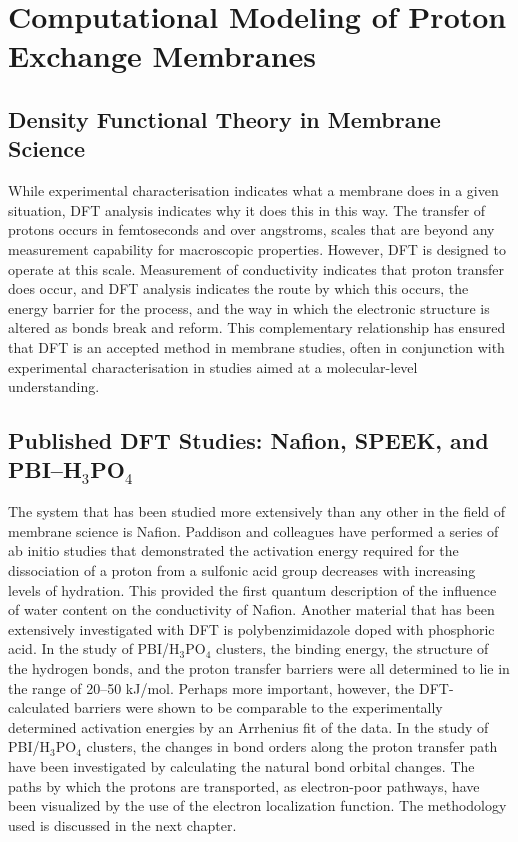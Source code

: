 \documentclass[12pt,a4paper]{report}
\begin{document}
\section{Computational Modeling of Proton Exchange Membranes}
\subsection{Density Functional Theory in Membrane Science}
While experimental characterisation indicates what a membrane does in a given situation, DFT analysis indicates why it does this in this way. The transfer of protons occurs in femtoseconds and over angstroms, scales that are beyond any measurement capability for macroscopic properties. However, DFT is designed to operate at this scale. Measurement of conductivity indicates that proton transfer does occur, and DFT analysis indicates the route by which this occurs, the energy barrier for the process, and the way in which the electronic structure is altered as bonds break and reform. This complementary relationship has ensured that DFT is an accepted method in membrane studies, often in conjunction with experimental characterisation in studies aimed at a molecular-level understanding.\cite{18,19}

\subsection{Published DFT Studies: Nafion, SPEEK, and PBI–H\(_3\)PO\(_4\)}
The system that has been studied more extensively than any other in the field of membrane science is Nafion. Paddison and colleagues have performed a series of ab initio studies that demonstrated the activation energy required for the dissociation of a proton from a sulfonic acid group decreases with increasing levels of hydration. This provided the first quantum description of the influence of water content on the conductivity of Nafion.\cite{18,19}
Another material that has been extensively investigated with DFT is polybenzimidazole doped with phosphoric acid. In the study of PBI/H\(_3\)PO\(_4\) clusters, the binding energy, the structure of the hydrogen bonds, and the proton transfer barriers were all determined to lie in the range of 20–50 kJ/mol.\cite{20,59} Perhaps more important, however, the DFT-calculated barriers were shown to be comparable to the experimentally determined activation energies by an Arrhenius fit of the data. In the study of PBI/H\(_3\)PO\(_4\) clusters, the changes in bond orders along the proton transfer path have been investigated by calculating the natural bond orbital changes. The paths by which the protons are transported, as electron-poor pathways, have been visualized by the use of the electron localization function. The methodology used is discussed in the next chapter.
\end{document}
